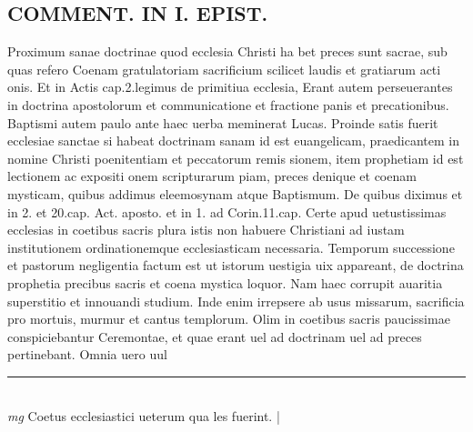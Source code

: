 \documentclass{article}
\begin{document}
\begin{pages}
\section*{COMMENT. IN I. EPIST. }\pstart Proximum sanae doctrinae quod ecclesia Christi ha bet preces sunt sacrae, sub quas refero Coenam gratulatoriam sacrificium scilicet laudis et gratiarum acti onis. Et in Actis cap.2.legimus de primitiua ecclesia, Erant autem perseuerantes in doctrina apostolorum et communicatione et fractione panis et precationibus. Baptismi autem paulo ante haec uerba meminerat Lucas. Proinde satis fuerit ecclesiae sanctae si habeat doctrinam sanam id est euangelicam, praedicantem in nomine Christi poenitentiam et peccatorum remis sionem, item prophetiam id est lectionem ac expositi onem scripturarum piam, preces denique et coenam mysticam, quibus addimus eleemosynam atque Baptismum. De quibus diximus et in 2. et 20.cap. Act. aposto. et in 1. ad Corin.11.cap. Certe apud uetustissimas ecclesias in coetibus sacris plura istis non habuere Christiani ad iustam institutionem ordinationemque ecclesiasticam necessaria. Temporum successione et pastorum negligentia factum est ut istorum uestigia uix appareant, de doctrina prophetia precibus sacris et coena mystica loquor. Nam haec corrupit auaritia superstitio et innouandi studium. Inde enim irrepsere ab usus missarum, sacrificia pro mortuis, murmur et cantus templorum. Olim in coetibus sacris paucissimae conspiciebantur Ceremontae, et quae erant uel ad doctrinam uel ad preces pertinebant. Omnia uero uul\pend
\vspace{0.5cm}\noindent
\vspace{0.2cm}\rule{1cm}{0.2pt}\\ 
\hspace{0.2cm}\textit{mg}
\footnotesize Coetus ecclesiastici ueterum qua les fuerint. 
\normalsize| 

\end{pages}
\end{document}
